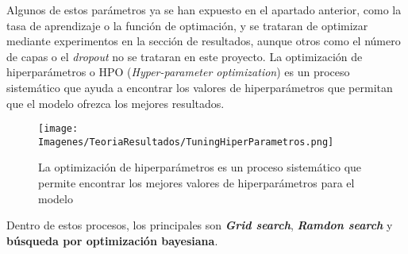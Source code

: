 \documentclass{report}
\begin{document}
Algunos de estos parámetros ya se han expuesto en el apartado anterior, como la tasa de aprendizaje o la función de optimación, y se trataran de optimizar mediante experimentos en la sección de resultados, aunque otros como el número de capas o el \textit{dropout} no se trataran en este proyecto. La optimización de hiperparámetros o HPO (\textit{Hyper-parameter optimization}) es un proceso sistemático que ayuda a encontrar los valores de hiperparámetros que permitan que el modelo ofrezca los mejores resultados.



\vspace{0.4cm}
\begin{figure}[hbpt]
      \centering
	 \texttt{[image: Imagenes/TeoriaResultados/TuningHiperParametros.png]}
	 \caption{ La optimización de hiperparámetros es un proceso sistemático que permite encontrar los mejores valores de hiperparámetros para el modelo \cite{OptimizacionArtBasico}}
	 \label{fig:HPO}
\end{figure}
\vspace{0.4cm}



Dentro de estos procesos, los principales son \textbf{\textit{Grid search}}, \textbf{\textit{Ramdon search}} y \textbf{búsqueda por optimización bayesiana}.
\end{document}
